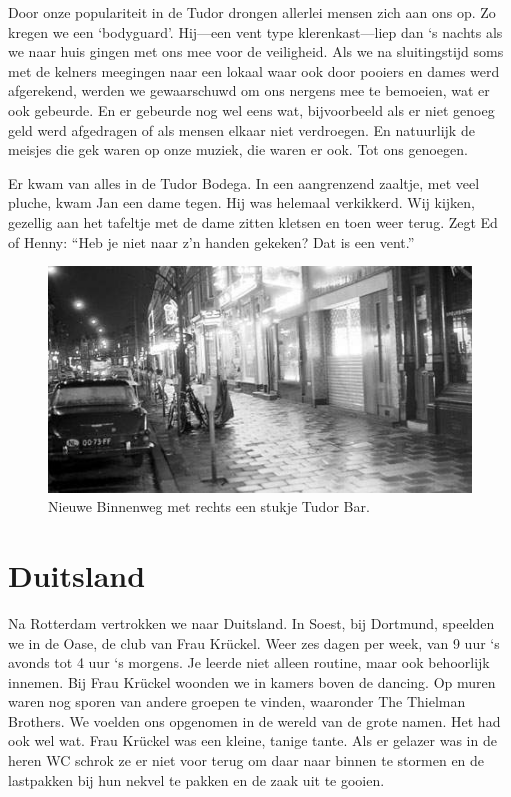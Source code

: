 \documentclass[12pt,twoside, openright]{memoir}
\begin{document}
Door onze populariteit in de Tudor drongen allerlei mensen zich aan ons op. Zo kregen we een `bodyguard'. Hij---een vent type klerenkast---liep dan `s nachts als we naar huis gingen met ons mee voor de veiligheid. Als we na sluitingstijd soms met de kelners meegingen naar een lokaal waar ook door pooiers en dames werd afgerekend, werden we gewaarschuwd om ons nergens mee te bemoeien, wat er ook gebeurde. En er gebeurde nog wel eens wat, bijvoorbeeld als er niet genoeg geld werd afgedragen of als mensen elkaar niet verdroegen. En natuurlijk de meisjes die gek waren op onze muziek, die waren er ook. Tot ons genoegen. 

Er kwam van alles in de Tudor Bodega. In een aangrenzend zaaltje, met veel pluche, kwam Jan een dame tegen. Hij was helemaal verkikkerd. Wij kijken, gezellig aan het tafeltje met de dame zitten kletsen en toen weer terug. Zegt Ed of Henny: ``Heb je niet naar z’n handen gekeken? Dat is een vent.'' 

\begin{figure}
\centering
\includegraphics[width=\textwidth]{img/4-TudorR}
\caption*{\footnotesize Nieuwe Binnenweg met rechts een stukje Tudor Bar.}
\end{figure}

\section*{Duitsland} %
\label{cha:duitsland}

Na Rotterdam vertrokken we naar Duitsland. In Soest, bij Dortmund, speelden we in de Oase, de club van Frau Krückel. Weer zes dagen per week, van 9 uur `s avonds tot 4 uur `s morgens. Je leerde niet alleen routine, maar ook behoorlijk innemen. Bij Frau Krückel woonden we in kamers boven de dancing. Op muren waren nog sporen van andere groepen te vinden, waaronder The Thielman Brothers. We voelden ons opgenomen in de wereld van de grote namen. Het had ook wel wat. Frau Krückel was een kleine, tanige tante. Als er gelazer was in de heren WC schrok ze er niet voor terug om daar naar binnen te stormen en de lastpakken bij hun nekvel te pakken en de zaak uit te gooien.
\end{document}
